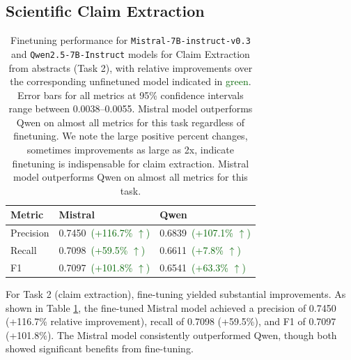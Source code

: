 \documentclass[11pt]{article}
\begin{document}
\subsection{Scientific Claim Extraction}

\begin{table}[h]
\centering
\small
\begin{tabular}{lll}
\toprule
Metric & Mistral & Qwen \\
\midrule
Precision
 & 0.7450 \textcolor{darkgreen}{\,(+116.7\% $\uparrow$)} 
 & 0.6839 \textcolor{darkgreen}{\,(+107.1\% $\uparrow$)} \\
Recall 
 & 0.7098 \textcolor{darkgreen}{\,(+59.5\% $\uparrow$)} 
 & 0.6611 \textcolor{darkgreen}{\,(+7.8\% $\uparrow$)} \\
F1 
 & 0.7097 \textcolor{darkgreen}{\,(+101.8\% $\uparrow$)} 
 & 0.6541 \textcolor{darkgreen}{\,(+63.3\% $\uparrow$)} \\
\bottomrule
\end{tabular}
\caption{Finetuning performance for \texttt{Mistral-7B-instruct-v0.3}
 and \texttt{Qwen2.5-7B-Instruct}
 models for Claim Extraction from abstracts (Task 2), with relative improvements over the corresponding unfinetuned model indicated in \textcolor{darkgreen}{green}. Error bars for all metrics at 95\% confidence intervals range between 0.0038--0.0055. Mistral model outperforms Qwen on almost all metrics for this task regardless of finetuning. We note the large positive percent changes, sometimes improvements as large as 2x, indicate finetuning is indispensable for claim extraction. Mistral model outperforms Qwen on almost all metrics for this task.}
\label{tab:eval_technontech2claims}
\end{table}

For Task 2 (claim extraction), fine-tuning yielded substantial improvements. As shown in Table \ref{tab:eval_technontech2claims}, the fine-tuned Mistral model achieved a precision of 0.7450 (+116.7\% relative improvement), recall of 0.7098 (+59.5\%), and F1 of 0.7097 (+101.8\%). The Mistral model consistently outperformed Qwen, though both showed significant benefits from fine-tuning.
\end{document}
